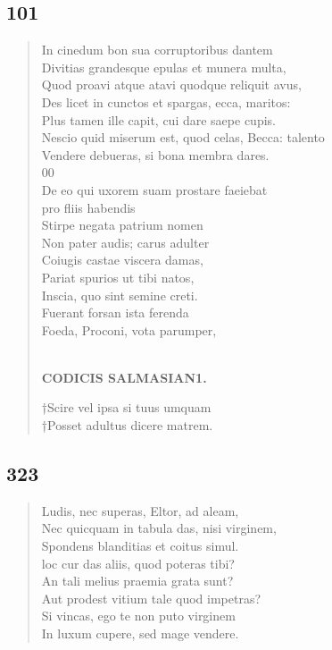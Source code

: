 \documentclass[11pt, a4paper]{report}
\begin{document}
            \subsection*{101}
      \begin{verse}
      In cinedum bon sua corruptoribus dantem \\ Divitias grandesque epulas et munera multa, \\ Quod proavi atque atavi quodque reliquit avus, \\ Des licet in cunctos et spargas, ecca, maritos: \\ Plus tamen ille capit, cui dare saepe cupis. \\ Nescio quid miserum est, quod celas, Becca: talento \\ Vendere debueras, si bona membra dares. \\ 00 \\ De eo qui uxorem suam prostare faeiebat \\ pro fliis habendis \\ Stirpe negata patrium nomen \\ Non pater audis; carus adulter \\ Coiugis castae viscera damas, \\ Pariat spurios ut tibi natos, \\ Inscia, quo sint semine creti. \\ Fuerant forsan ista ferenda \\ Foeda, Proconi, vota parumper, \\ 
        ﻿\pagebreak 
    \begin{center} \textbf{CODICIS SALMASIAN1.} \end{center} \marginpar{[265]} †Scire vel ipsa si tuus umquam \\ †Posset adultus dicere matrem. \\ 
      \end{verse}
  
            \subsection*{323}
      \begin{verse}
      Ludis, nec superas, Eltor, ad aleam, \\ Nec quicquam in tabula das, nisi virginem, \\ Spondens blanditias et coitus simul. \\ loc cur das aliis, quod poteras tibi? \\ An tali melius praemia grata sunt? \\ Aut prodest vitium tale quod impetras? \\ Si vincas, ego te non puto virginem \\ In luxum cupere, sed mage vendere. \\ 
      \end{verse}
  
\end{document}
